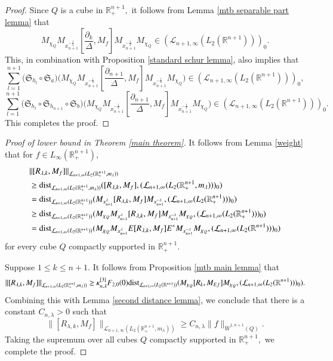 \documentclass[12pt]{amsart}
\begin{document}
\begin{proof}
Since $Q$ is a cube in $\mathbb{R}^{n+1}_+,$ it follows from Lemma \ref{mtb separable part lemma} that
 $$M_{\chi_Q}M_{x_{n+1}^{-\frac12}}[\frac{\partial_k}{\Delta},M_f]M_{x_{n+1}^{-\frac12}}M_{\chi_Q}\in (\mathcal{L}_{n+1,\infty}(L_2(\mathbb{R}^{n+1})))_0.$$
This, in combination with Proposition \ref{standard schur lemma}, also implies that
$$\sum_{l=1}^{n+1}\Big(\mathfrak{S}_{h_l}\circ\mathfrak{S}_a\Big)\Big(M_{\chi_Q}M_{x_{n+1}^{-\frac12}}[\frac{\partial_{n+1}}{\Delta},M_f]M_{x_{n+1}^{-\frac12}}M_{\chi_Q}\Big)\in (\mathcal{L}_{n+1,\infty}(L_2(\mathbb{R}^{n+1})))_0,$$
$$\sum_{l=1}^{n+1}\Big(\mathfrak{S}_{h_l}\circ\mathfrak{S}_{h_{n+1}}\circ\mathfrak{S}_b\Big)\Big(M_{\chi_Q}M_{x_{n+1}^{-\frac12}}[\frac{\partial_{n+1}}{\Delta},M_f]M_{x_{n+1}^{-\frac12}}M_{\chi_Q}\Big)\in (\mathcal{L}_{n+1,\infty}(L_2(\mathbb{R}^{n+1})))_0.$$
This completes the proof.
\end{proof}


\begin{proof}[Proof of lower bound in Theorem \ref{main theorem}] It follows from Lemma \ref{weight} that for $f\in L_{\infty}(\mathbb{R}^{n+1}_+),$
\begin{align*}
&\|[R_{\lambda,k},M_f]\|_{\mathcal{L}_{n+1,\infty}(L_2(\mathbb{R}^{n+1}_+,m_{\lambda}))}\\
&\geq {\rm dist}_{\mathcal{L}_{n+1,\infty}(L_2(\mathbb{R}^{n+1}_+,m_{\lambda}))}([R_{\lambda,k},M_f],(\mathcal{L}_{n+1,\infty}(L_2(\mathbb{R}^{n+1}_+,m_{\lambda})))_0)\\
&={\rm dist}_{\mathcal{L}_{n+1,\infty}(L_2(\mathbb{R}^{n+1}_+))}(M_{x_{n+1}^{\lambda}}[R_{\lambda,k},M_f]M_{x_{n+1}^{-\lambda}},(\mathcal{L}_{n+1,\infty}(L_2(\mathbb{R}^{n+1}_+)))_0)\\
&\geq {\rm dist}_{\mathcal{L}_{n+1,\infty}(L_2(\mathbb{R}^{n+1}_+))}(M_{\chi_Q} M_{x_{n+1}^{\lambda}}[R_{\lambda,k},M_f]M_{x_{n+1}^{-\lambda}} M_{\chi_Q},(\mathcal{L}_{n+1,\infty}(L_2(\mathbb{R}^{n+1}_+)))_0)\\
&={\rm dist}_{\mathcal{L}_{n+1,\infty}(L_2(\mathbb{R}^{n+1}))}(M_{\chi_Q} M_{x_{n+1}^{\lambda}}E[R_{\lambda,k},M_f]E^{\ast}M_{x_{n+1}^{-\lambda}} M_{\chi_Q},(\mathcal{L}_{n+1,\infty}(L_2(\mathbb{R}^{n+1})))_0)
\end{align*}
for every cube $Q$ compactly supported in $\mathbb{R}^{n+1}_+.$	

Suppose $1\leq k\leq n+1.$ It follows from Proposition \ref{mtb main lemma} that
\begin{align*}
\|[R_{\lambda,k},M_f]\|_{\mathcal{L}_{n+1,\infty}(L_2(\mathbb{R}^{n+1}_+,m_{\lambda}))}\geq \kappa^{[3]}_{n,\lambda}F_{2,0}(0){\rm dist}_{\mathcal{L}_{n+1,\infty}(L_2(\mathbb{R}^{n+1}))}(M_{\chi_Q} [R_k,M_{Ef}] M_{\chi_Q},(\mathcal{L}_{n+1,\infty}(L_2(\mathbb{R}^{n+1})))_0).
\end{align*}
Combining this with Lemma \ref{second distance lemma}, we conclude that there is a constant $C_{n,\lambda}>0$ such that
$$\|[R_{\lambda,k},M_f]\|_{\mathcal{L}_{n+1,\infty}(L_2(\mathbb{R}^{n+1}_+,m_{\lambda}))}\geq C_{n,\lambda} \|f\|_{\dot{W}^{1,n+1}(Q)}.$$
Taking the supremum over all cubes $Q$ compactly supported in $\mathbb{R}^{n+1}_+,$ we complete the proof.	
\end{proof}
\end{document}
